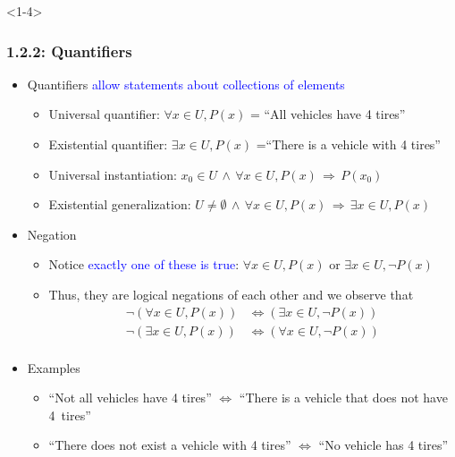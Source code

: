 \documentclass[10pt,english,aspectratio=169]{beamer}
\begin{document}
\begin{frame}<1-4> \frametitle{1.2.2: Quantifiers}

\begin{itemize}
\setlength\itemsep{2mm}
\item<1-> Quantifiers \textcolor{blue}{allow statements about collections of elements} \vspace{0.5mm}
\begin{itemize}
 \setlength\itemsep{1.5mm}
 \item Universal quantifier: $\forall x\!\in\! U, P(x)$ = ``All vehicles have 4 tires''
 \item Existential quantifier: $\exists x\!\in\! U, P(x)$ =``There is a vehicle with 4 tires''
 \item Universal instantiation: $x_0 \in U \, \wedge \, \forall x \in U, P(x) \,\Rightarrow\, P(x_0)$ 
 \item Existential generalization: $U\neq \emptyset \, \wedge \, \forall x \in U, P(x) \,\Rightarrow\, \exists x \in U, P(x)$ \vspace{0.5mm}
\end{itemize}

\item<2-> Negation \vspace{1mm}
\begin{itemize}
 \setlength\itemsep{1.5mm}
 \item Notice \textcolor{blue}{exactly one of these is true}: $\forall x\!\in\! U, P(x)$ or $\exists x\!\in\! U, \neg P(x)$
 \item<3-> Thus, they are logical negations of each other and we observe that \vspace{-1.5mm}
 \begin{align*}
   \neg \left(\forall x\!\in\! U, P(x) \right) &\Leftrightarrow \left( \exists x\!\in\! U, \neg P(x) \right) \\
   \neg \left(\exists x\!\in\! U, P(x) \right) &\Leftrightarrow \left( \forall x\!\in\! U, \neg P(x) \right) \\[-9mm]
 \end{align*}   
\end{itemize}

\item<4-> Examples \vspace{0.5mm}
\begin{itemize}
 \setlength\itemsep{1.5mm}
 \item ``Not all vehicles have 4 tires'' $\Leftrightarrow$ ``There is a vehicle that does not have 4~tires''$\!\!\!\!\!\!\!\!\!\!\!\!\!\!\!\!$
 \item ``There does not exist a vehicle with 4 tires'' $\Leftrightarrow$ ``No vehicle has 4 tires''\hspace*{-15mm}
  

\end{itemize}
\end{itemize}
\end{frame}
\end{document}
